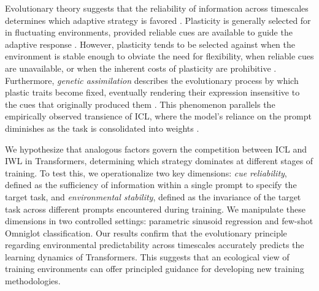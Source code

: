 Evolutionary theory suggests that the reliability of information across timescales determines which adaptive strategy is favored \cite{stearns1989evolutionary}. Plasticity is generally selected for in fluctuating environments, provided reliable cues are available to guide the adaptive response \cite{stearns1989evolutionary, stephens1989variance}. However, plasticity tends to be selected against when the environment is stable enough to obviate the need for flexibility, when reliable cues are unavailable, or when the inherent costs of plasticity are prohibitive \cite{stearns1989evolutionary, stephens1989variance, dewitt1998costs}. Furthermore, \textit{genetic assimilation} describes the evolutionary process by which plastic traits become fixed, eventually rendering their expression insensitive to the cues that originally produced them \cite{waddington1953genetic, pigliucci2006phenotypic}. This phenomenon parallels the empirically observed transience of ICL, where the model's reliance on the prompt diminishes as the task is consolidated into weights \cite{singh2023transient}.

We hypothesize that analogous factors govern the competition between ICL and IWL in Transformers, determining which strategy dominates at different stages of training. To test this, we operationalize two key dimensions: \textit{cue reliability}, defined as the sufficiency of information within a single prompt to specify the target task, and \textit{environmental stability}, defined as the invariance of the target task across different prompts encountered during training. We manipulate these dimensions in two controlled settings: parametric sinusoid regression and few-shot Omniglot classification. Our results confirm that the evolutionary principle regarding environmental predictability across timescales accurately predicts the learning dynamics of Transformers. This suggests that an ecological view of training environments can offer principled guidance for developing new training methodologies.



